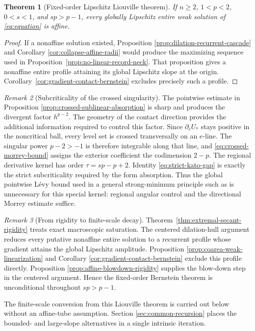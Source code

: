 \documentclass[11pt,reqno]{amsart}
\numberwithin{equation}{section}
\newtheorem{theorem}{Theorem}[section]
\theoremstyle{remark}
\newtheorem{remark}[theorem]{Remark}
\begin{document}
\begin{theorem}[Fixed-order Lipschitz Liouville theorem]
\label{thm:fixed-order-centered-closure}
If \(n\ge2\), $1<p<2$, $0<s<1$, and $sp>p-1$, every
globally Lipschitz entire weak solution of \eqref{eq:equation} is affine.
\end{theorem}

\begin{proof}
If a nonaffine solution existed, Proposition
\ref{prop:dilation-recurrent-cascade} and Corollary
\ref{cor:collapse-affine-radii} would produce the maximizing sequence used in
Proposition~\ref{prop:no-linear-record-neck}.  That proposition gives a
nonaffine entire profile attaining its global Lipschitz slope at the
origin.  Corollary~\ref{cor:gradient-contact-bernstein} excludes precisely
such a profile.
\end{proof}

\begin{remark}[Subcriticality of the crossed singularity]
\label{rem:gradient-contact-endpoint}
The pointwise estimate in Proposition
\ref{prop:crossed-sublinear-absorption} is sharp and produces the
divergent factor $h^{p-2}$.  The geometry of the contact direction
provides the additional information required to control this factor.  Since
$\partial_eU_*$ stays positive in the noncritical ball, every level set is
crossed transversally on an $e$-line.  The singular power $p-2>-1$ is
therefore integrable along that line, and
\eqref{eq:crossed-morrey-bound} assigns the exterior coefficient the
codimension $2-p$.  The regional derivative kernel has order
$\tau=sp-p+2$.  Identity \eqref{eq:strict-kato-gap} is exactly the
strict subcriticality required by the form absorption.  Thus the global
pointwise L\'evy bound used in a general strong-minimum principle such as
\cite{JarohsWethSMP} is unnecessary for this special kernel: regional
angular control and the directional Morrey estimate suffice.
\end{remark}

\begin{remark}[From rigidity to finite-scale decay]
Theorem~\ref{thm:extremal-secant-rigidity} treats exact macroscopic
saturation.  The centered dilation-hull argument reduces every
putative nonaffine entire solution to a recurrent profile whose gradient
attains the global Lipschitz amplitude.  Proposition
\ref{prop:coarea-weak-linearization} and Corollary
\ref{cor:gradient-contact-bernstein} exclude this profile directly.
Proposition
\ref{prop:affine-blowdown-rigidity} supplies the blow-down step in the
centered argument.  Hence the fixed-order Bernstein theorem
is unconditional throughout \(sp>p-1\).

The finite-scale conversion from this Liouville theorem is carried out
below without an affine-tube assumption.  Section
\ref{sec:common-recursion} places the bounded- and large-slope
alternatives in a single intrinsic iteration.
\end{remark}
\end{document}
